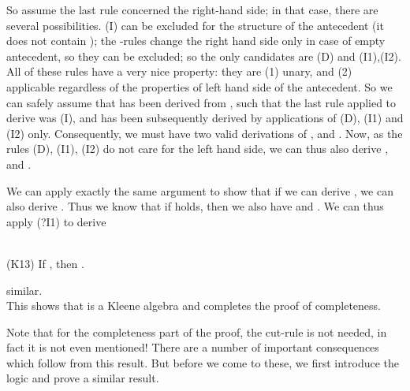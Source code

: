 \documentclass{eptcs}
\newcommand{\proofend}{\hfill }
\begin{document}
So assume the last rule concerned the right-hand side;
in that case, there are several possibilities.
(I) can be excluded for the structure of the antecedent 
(it does not
contain ); 
the -rules  change the right hand side only in case of
empty antecedent, so they can be excluded; so the only
candidates are  (D) and (I1),(I2). All of these rules have
a very nice property: they are (1) unary, and (2) applicable
regardless of the properties of left hand side of the
antecedent. So we can safely assume that
 has been derived from 
, such that the last rule applied to
derive
 was (I), and 
 has been subsequently derived 
by applications of (D), (I1) and (I2) only. Consequently,
we must have two valid derivations of 
, and . Now, as the rules
(D), (I1), (I2) do not care for the left hand side, we can
thus also derive , and .

We can apply exactly the same argument to show that if we can derive
, we can also derive . 
Thus we know
that if  holds, then we 
also have  and .
We can thus apply (?I1) to derive


\\

(K13) If , then .

similar.
\\

This shows that  is a Kleene algebra and completes the proof
of completeness.
\proofend

Note that for the completeness part of the proof, the cut-rule is
not needed, in fact it is not even mentioned! There are a number 
of important consequences which follow from this
result. But before we come to these, we first introduce the logic 
and prove a similar result.

\section{}
\end{document}
